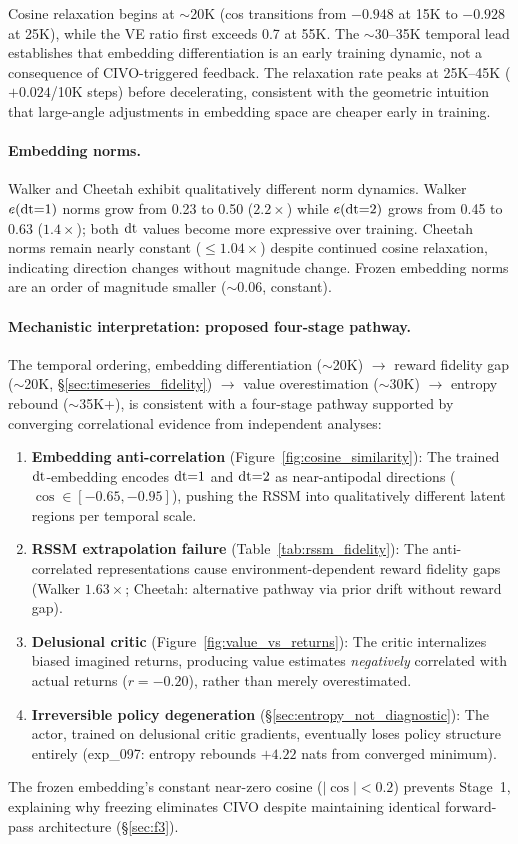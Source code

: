 Cosine relaxation begins at ${\sim}$20K (cos transitions from $-0.948$ at 15K to $-0.928$ at 25K), while the VE ratio first exceeds 0.7 at 55K. The ${\sim}$30--35K temporal lead establishes that embedding differentiation is an early training dynamic, not a consequence of CIVO-triggered feedback. The relaxation rate peaks at 25K--45K ($+0.024$/10K steps) before decelerating, consistent with the geometric intuition that large-angle adjustments in embedding space are cheaper early in training.

\paragraph{Embedding norms.}
Walker and Cheetah exhibit qualitatively different norm dynamics. Walker $e(\mathrm{dt}{=}1)$ norms grow from 0.23 to 0.50 ($2.2\times$) while $e(\mathrm{dt}{=}2)$ grows from 0.45 to 0.63 ($1.4\times$); both $\mathrm{dt}$ values become more expressive over training. Cheetah norms remain nearly constant ($\leq 1.04\times$) despite continued cosine relaxation, indicating direction changes without magnitude change. Frozen embedding norms are an order of magnitude smaller (${\sim}0.06$, constant).

\paragraph{Mechanistic interpretation: proposed four-stage pathway.}
The temporal ordering, embedding differentiation (${\sim}$20K) $\to$ reward fidelity gap (${\sim}$20K, \S\ref{sec:timeseries_fidelity}) $\to$ value overestimation (${\sim}$30K) $\to$ entropy rebound (${\sim}$35K+), is consistent with a four-stage pathway supported by converging correlational evidence from independent analyses:
\begin{enumerate}[nosep,leftmargin=*]
\item \textbf{Embedding anti-correlation} (Figure~\ref{fig:cosine_similarity}): The trained $\mathrm{dt}$-embedding encodes $\mathrm{dt}{=}1$ and $\mathrm{dt}{=}2$ as near-antipodal directions ($\cos \in [{-}0.65, {-}0.95]$), pushing the RSSM into qualitatively different latent regions per temporal scale.
\item \textbf{RSSM extrapolation failure} (Table~\ref{tab:rssm_fidelity}): The anti-correlated representations cause environment-dependent reward fidelity gaps (Walker $1.63\times$; Cheetah: alternative pathway via prior drift without reward gap).
\item \textbf{Delusional critic} (Figure~\ref{fig:value_vs_returns}): The critic internalizes biased imagined returns, producing value estimates \emph{negatively} correlated with actual returns ($r = {-}0.20$), rather than merely overestimated.
\item \textbf{Irreversible policy degeneration} (\S\ref{sec:entropy_not_diagnostic}): The actor, trained on delusional critic gradients, eventually loses policy structure entirely (exp\_097: entropy rebounds $+4.22$ nats from converged minimum).
\end{enumerate}
The frozen embedding's constant near-zero cosine ($|\cos| < 0.2$) prevents Stage~1, explaining why freezing eliminates CIVO despite maintaining identical forward-pass architecture (\S\ref{sec:f3}).

